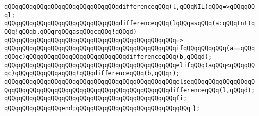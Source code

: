\verb|qQQqqQQqqQQqqQQqqQQqqQQqqQQqqQQqdifferenceqQQq(l,qQQqNIL)qQQq=>qQQqqQQql;|\newline
\newline
\verb|qQQqqQQqqQQqqQQqqQQqqQQqqQQqqQQqdifferenceqQQq(lqQQqasqQQq(a:qQQqInt)qQQq!qQQqb,qQQqrqQQqasqQQqcqQQq!qQQqd)|\newline
\verb|qQQqqQQqqQQqqQQqqQQqqQQqqQQqqQQqqQQqqQQqqQQqqQQq=>|\newline
\verb|qQQqqQQqqQQqqQQqqQQqqQQqqQQqqQQqqQQqqQQqqQQqqQQqifqQQqqQQqqQQq(a==qQQqqQQqc)qQQqqQQqqQQqqQQqqQQqqQQqqQQqdifferenceqQQq(b,qQQqd);|\newline
\verb|qQQqqQQqqQQqqQQqqQQqqQQqqQQqqQQqqQQqqQQqqQQqqQQqelifqQQq(aqQQq<qQQqqQQqc)qQQqqQQqqQQqaqQQq!qQQqdifferenceqQQq(b,qQQqr);|\newline
\verb|qQQqqQQqqQQqqQQqqQQqqQQqqQQqqQQqqQQqqQQqqQQqqQQqelseqQQqqQQqqQQqqQQqqQQqqQQqqQQqqQQqqQQqqQQqqQQqqQQqqQQqqQQqqQQqqQQqdifferenceqQQq(l,qQQqd);|\newline
\verb|qQQqqQQqqQQqqQQqqQQqqQQqqQQqqQQqqQQqqQQqqQQqqQQqfi;|\newline
\verb|qQQqqQQqqQQqqQQqend;qQQqqQQqqQQqqQQqqQQqqQQqqQQqqQQq|\newline
\verb|};|\newline
\newline
\newline

